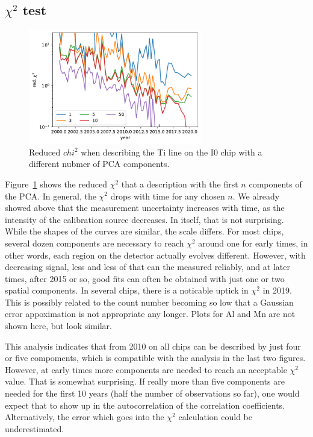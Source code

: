 \documentclass[]{spie}  %
\begin{document}
\subsection{$\chi^2$ test}
\begin{figure} [ht]
  \begin{center}
    \includegraphics[height=5cm]{figures/chi2.pdf}
  \end{center}
  \caption
      {Reduced $chi^2$ when describing the Ti line on the I0 chip with a different nubmer of PCA components.
        \label{fig:chi2}}
\end{figure}

Figure~\ref{fig:chi2} shows the reduced $\chi^2$ that a description with the first $n$ components of the PCA. In general, the $\chi^2$ drops with time for any chosen $n$. We already showed above that the measurement uncertainty increases with time, as the intensity of the calibration source decreases. In itself, that is not surprising. While the shapes of the curves are similar, the scale differs. For most chips, several dozen components are necessary to reach  $\chi^2$ around one for early times, in other words, each region on the detector actually evolves different. However, with decreasing signal, less and less of that can the measured reliably, and at later times, after 2015 or so, good fits can often be obtained with just one or two spatial components. In several chips, there is a noticable uptick in $\chi^2$ in 2019. This is possibly related to the count number becoming so low that a Gaussian error appoximation is not appropriate any longer. Plots for Al and Mn are not shown here, but look similar.

This analysis indicates that from 2010 on all chips can be described by just four or five compoments, which is compatible with the analysis in the last two figures. However, at early times more components are needed to reach an acceptable $\chi^2$ value. That is somewhat surprising. If really more than five components are needed for the first 10 years (half the number of observations so far), one would expect that to show up in the autocorrelation of the correlation coefficients. Alternatively, the error which goes into the $\chi^2$ calculation could be underestimated.
\end{document}
